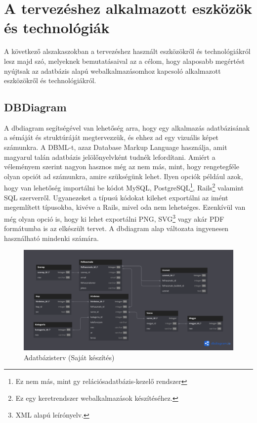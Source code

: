 \documentclass[]{thesis-ekf}
\theoremstyle{definition}
\theoremstyle{remark}
\begin{document}
	\section{A tervezéshez alkalmazott eszközök és technológiák}
		A következő alszakaszokban a tervezéshez használt eszközökről és technológiákról lesz majd szó, melyeknek bemutatásaival az a célom, hogy alaposabb megértést nyújtsak az adatbázis alapú webalkalmazásomhoz kapcsoló alkalmazott eszközökről és technológiákról.
	\subsection{DBDiagram}
	A dbdiagram segítségével van lehetőség arra, hogy egy alkalmazás adatbázisának a sémáját és struktúráját megtervezzük, és ehhez ad egy vizuális képet számunkra. A DBML-t, azaz Database Markup Language használja, amit magyarul talán adatbázis jelölőnyelvként tudnék lefordítani. Amiért a véleményem szerint nagyon hasznos még az nem más, mint, hogy rengetegféle olyan opciót ad számunkra, amire szükségünk lehet. Ilyen opciók például azok, hogy van lehetőség importálni be kódot MySQL, PostgreSQL\footnote{Ez nem más, mint gy relációsadatbázis-kezelő rendszer}, Rails\footnote{Ez egy keretrendszer webalkalmazások készítéséhez.} valamint SQL szerverről. Ugyanezeket a típusú kódokat kilehet exportálni az imént megemlített típusokba, kivéve a Rails, mivel oda nem lehetséges. Ezenkívül van még olyan opció is, hogy ki lehet exportálni PNG, SVG\footnote{XML alapú leírónyelv.} vagy akár PDF formátumba is az elkészült tervet. A dbdiagram alap változata ingyenesen használható mindenki számára. \cite{Dbdiagram}
	
	\begin{figure}[ht!]
		\centering
		\includegraphics[width=15cm]{./tervezes/dbdiagram}
		\caption{Adatbázisterv (Saját készítés)} 
		\label{dbdiagram}
	\end{figure}
	
\end{document}
